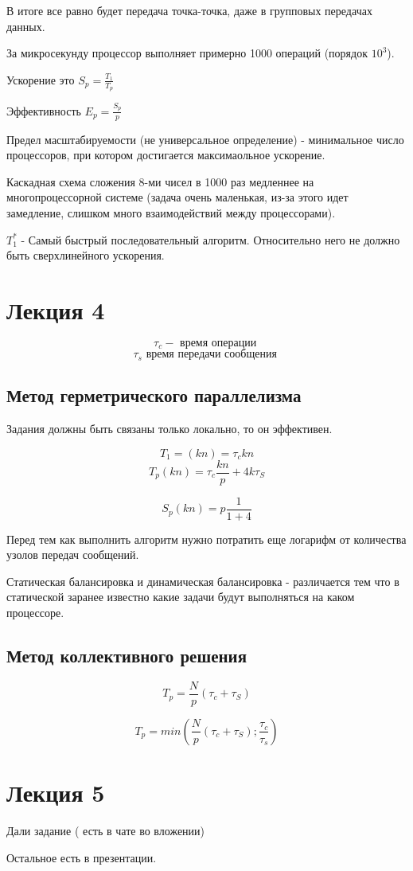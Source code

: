 \documentclass[14pt]{extarticle}
\begin{document}
В итоге все равно будет передача точка-точка, даже в групповых передачах данных.

За микросекунду процессор выполняет примерно 1000 операций (порядок $ 10^3 $). 

Ускорение это $ S_p = \frac{T_1}{T_p}  $

Эффективность $ E_p = \frac{S_p }{p} $

Предел масштабируемости (не универсальное определение) - минимальное число процессоров, при котором достигается максимаольное ускорение.

Каскадная схема сложения 8-ми чисел в 1000 раз медленнее на многопроцессорной системе (задача очень маленькая, из-за этого идет замедление, слишком много взаимодействий между процессорами).

$ T_1^* $ - Самый быстрый последовательный алгоритм. Относительно него не должно быть сверхлинейного ускорения.

\section{Лекция 4}

\[ \tau_c - \textrm{ время операции } \]
\[ \tau_s \textrm{ время передачи сообщения } \]

\subsection{Метод герметрического параллелизма}

Задания должны быть связаны только локально, то он эффективен.

\[ T_1 =(kn) = \tau_c kn \]
\[ T_p(kn) = \tau_c \frac{kn}{p} + 4k \tau_S \]

\[ S_p (kn) = p \frac{1}{1+4}  \]

Перед тем как выполнить алгоритм нужно потратить еще логарифм от количества узолов передач сообщений.

Статическая балансировка и динамическая балансировка - различается тем что в статической заранее известно какие задачи будут выполняться на каком процессоре.

\subsection{Метод коллективного решения}

\[ T_p = \frac{N }{p}(\tau_c + \tau_S) \]

\[ T_p = min(\frac{N }{p}(\tau_c + \tau_S); \frac{\tau_c}{\tau_s}) \]

\section{Лекция 5}

Дали задание ( есть в чате во вложении)

Остальное есть в презентации.
\end{document}
